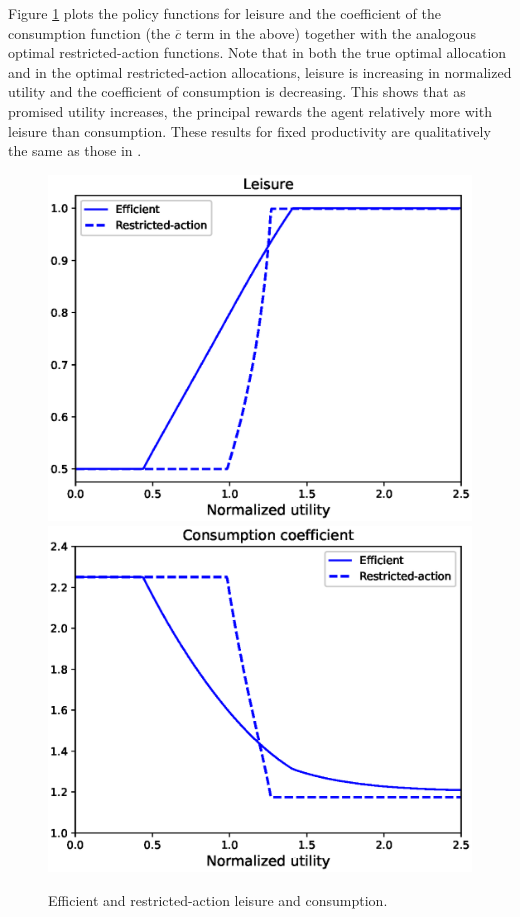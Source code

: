 \documentclass[11pt]{article}
\theoremstyle{plain}
\begin{document}
Figure \ref{fig:l_c} plots the policy functions for leisure and the coefficient of the consumption function (the $\overline{c}$ term in the above) together with the analogous optimal restricted-action functions. Note that in both the true optimal allocation and in the optimal restricted-action allocations, leisure is increasing in normalized utility and the coefficient of consumption is decreasing. This shows that as promised utility increases, the principal rewards the agent relatively more with leisure than consumption. These results for fixed productivity are qualitatively the same as those in \cite{sannikov_continuous-time_2008}.

\begin{figure}[!htb]
\centering
\includegraphics[width=0.49\linewidth]{leisure_ex}
\includegraphics[width=0.49\linewidth]{consumption_ex}
\caption{Efficient and restricted-action leisure and consumption.}\label{fig:l_c}
\end{figure}
\end{document}
